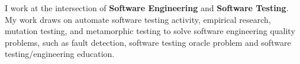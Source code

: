 

\begin{cvparagraph}

I work at the intersection of \textbf{Software Engineering} and \textbf{Software Testing}. My work draws on automate software testing activity, empirical research, mutation testing, and metamorphic testing to solve software engineering quality problems, such as fault detection, software testing oracle problem and software testing/engineering education.
\end{cvparagraph}
